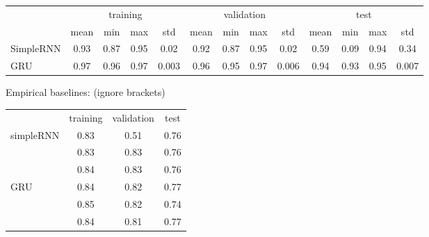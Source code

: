 \documentclass{article}
\begin{document}
\begin{table}[!h]
\begin{tabular}{l|cccc|cccc|cccc}
            & \multicolumn{4}{c}{training} & \multicolumn{4}{c}{validation} & \multicolumn{4}{c}{test}\\
            & mean & min & max & std & mean & min & max & std & mean & min & max & std \\ 
\hline
SimpleRNN   & 0.93 & 0.87 & 0.95 & 0.02 & 0.92 & 0.87 & 0.95 & 0.02 & 0.59 & 0.09 & 0.94 & 0.34\\ 
GRU         & 0.97 & 0.96 & 0.97 & 0.003 & 0.96 & 0.95 & 0.97 & 0.006 & 0.94 & 0.93 & 0.95 & 0.007\\      
\end{tabular}
\end{table}

Empirical baselines: (ignore brackets)

\begin{tabular}{|l|ccc|}
    \hline
    & training & validation & test\\
simpleRNN & 0.83 & 0.51 & 0.76\\
& 0.83 & 0.83 & 0.76\\
& 0.84 & 0.83 & 0.76\\
\hline
GRU & 0.84 & 0.82 & 0.77\\
& 0.85 & 0.82 & 0.74\\
& 0.84 & 0.81 & 0.77\\
\hline
\end{tabular}
\end{document}
